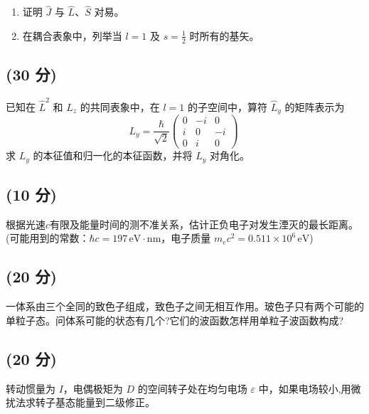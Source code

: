 \begin{enumerate}
    \item 证明 $\hat{J}$ 与 $\hat{L}$、$\hat{S}$ 对易。
    
    \item 在耦合表象中，列举当 $l=1$ 及 $s=\frac{1}{2}$ 时所有的基矢。
\end{enumerate}
\subsection{(30 分)}
已知在 $\hat{L}^2$ 和 $\hat{L}_z$ 的共同表象中，在 $l=1$ 的子空间中，算符 $\hat{L}_y$ 的矩阵表示为
\[
L_y = \frac{\hbar}{\sqrt{2}}
\begin{pmatrix}
0 & -i & 0 \\
i & 0 & -i \\
0 & i & 0 
\end{pmatrix}~
\]
求 $L_y$ 的本征值和归一化的本征函数，并将 $L_y$ 对角化。
\subsection{(10 分)}
根据光速$c$有限及能量时间的测不准关系，估计正负电子对发生湮灭的最长距离。(可能用到的常数：$\hbar c = 197 \, \text{eV} \cdot \text{nm}$，电子质量 $m_e c^2 = 0.511 \times 10^6 \, \text{eV}$)
\subsection{(20 分)}
一体系由三个全同的致色子组成，致色子之间无相互作用。玻色子只有两个可能的单粒子态。问体系可能的状态有几个?它们的波函数怎样用单粒子波函数构成?
\subsection{(20 分)}
转动惯量为 $I$，电偶极矩为 $D$ 的空间转子处在均匀电场 $\varepsilon$ 中，如果电场较小,用微扰法求转子基态能量到二级修正。